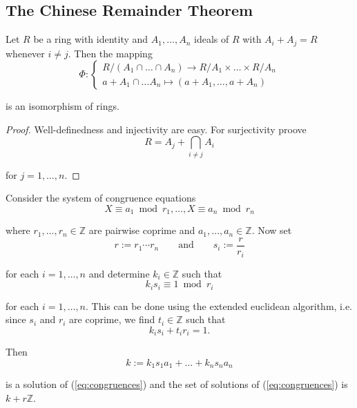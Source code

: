 \subsection{The Chinese Remainder Theorem}
\begin{theorem}
	Let $R$ be a ring with identity and $A_1,\dots,A_n$ ideals of $R$ with $A_i + A_j = R$ whenever $i \neq j$. Then the mapping
	\begin{equation}
		\Phi: \begin{cases}
			R/(A_1 \cap \dots \cap A_n) \to R/A_1 \times \dots \times R/A_n\\
			a + A_1 \cap \dots A_n \mapsto (a + A_1,\dots,a + A_n)
		\end{cases}
	\end{equation}

	\noindent is an isomorphism of rings.
	\label{thm:chinese_remainder}
\end{theorem}

\begin{proof}
	Well-definedness and injectivity are easy. For surjectivity proove 
	\begin{equation}
		R = A_j + \bigcap_{i \neq j} A_i
	\end{equation}

	\noindent for $j = 1,\dots,n$.
\end{proof}

\begin{example}
Consider the system of congruence equations
	\begin{equation}
		X \equiv a_1 \bmod r_1 , \dots , X \equiv a_n \bmod r_n
			\label{eq:congruences}
	\end{equation}

\noindent where $r_1,\dots,r_n \in \mathbb{Z}$ are pairwise coprime and $a_1,\dots,a_n \in \mathbb{Z}$. Now set 
\begin{equation}
	r := r_1 \cdots r_n \qquad \text{and} \qquad s_i := \frac{r}{r_i} 
\end{equation}

\noindent for each $i = 1,\dots,n$ and determine $k_i \in \mathbb{Z}$ such that 
\begin{equation}
	k_is_i \equiv 1 \bmod r_i
\end{equation}

\noindent for each $i = 1,\dots,n$. This can be done using the extended euclidean algorithm, i.e. since $s_i$ and $r_i$ are coprime, we find $t_i \in \mathbb{Z}$ such that
\begin{equation}
	k_is_i + t_ir_i = 1.
\end{equation}
			
Then 
\begin{equation}
	k := k_1s_1a_1 + \dots + k_ns_na_n
\end{equation}

\noindent is a solution of (\ref{eq:congruences}) and the set of solutions of (\ref{eq:congruences}) is $k + r\mathbb{Z}$.	
\end{example}
